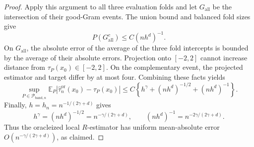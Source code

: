 \begin{proof}
Apply this argument to all three evaluation folds and let \(G_{\mathrm{all}}\) be the intersection of their good-Gram events.  The union bound and balanced fold sizes give
\[
P(G_{\mathrm{all}}^c)\leq C(nh^d)^{-1}.
\]
On \(G_{\mathrm{all}}\), the absolute error of the average of the three fold intercepts is bounded by the average of their absolute errors.  Projection onto \([-2,2]\) cannot increase distance from \(\tau_P(x_0)\in[-2,2]\).  On the complementary event, the projected estimator and target differ by at most four.  Combining these facts yields
\[
\sup_{P\in\mathcal P_{\mathrm{band},n}}
\mathbb E_P\left|\widehat\tau_n^{\mathrm{or}}(x_0)-\tau_P(x_0)\right|
\leq C\left\{h^\gamma+(nh^d)^{-1/2}+(nh^d)^{-1}\right\}.
\]
Finally, \(h=h_n=n^{-1/(2\gamma+d)}\) gives
\[
h^\gamma=(nh^d)^{-1/2}=n^{-\gamma/(2\gamma+d)},
\qquad
(nh^d)^{-1}=n^{-2\gamma/(2\gamma+d)}.
\]
Thus the oracleized local \(R\)-estimator has uniform mean-absolute error
\(O(n^{-\gamma/(2\gamma+d)})\), as claimed.
\end{proof}